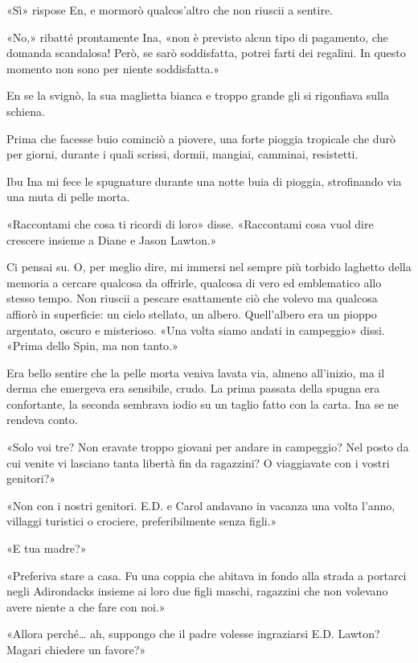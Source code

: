 «Sì» rispose En, e mormorò qualcos'altro che non riuscii a sentire.

«No,» ribatté prontamente Ina, «non è previsto alcun tipo di pagamento,
che domanda scandalosa! Però, se sarò soddisfatta, potrei farti dei
regalini. In questo momento non sono per niente soddisfatta.»

En se la svignò, la sua maglietta bianca e troppo grande gli si
rigonfiava sulla schiena.

Prima che facesse buio cominciò a piovere, una forte pioggia tropicale
che durò per giorni, durante i quali scrissi, dormii, mangiai, camminai,
resistetti.

\separatorefiori

Ibu Ina mi fece le spugnature durante una notte buia di pioggia,
strofinando via una muta di pelle morta.

«Raccontami che cosa ti ricordi di loro» disse. «Raccontami cosa vuol
dire crescere insieme a Diane e Jason Lawton.»

Ci pensai su. O, per meglio dire, mi immersi nel sempre più torbido
laghetto della memoria a cercare qualcosa da offrirle, qualcosa di vero
ed emblematico allo stesso tempo. Non riuscii a pescare esattamente ciò
che volevo ma qualcosa affiorò in superficie: un cielo stellato, un
albero. Quell'albero era un pioppo argentato, oscuro e misterioso. «Una
volta siamo andati in campeggio» dissi. «Prima dello Spin, ma non
tanto.»

Era bello sentire che la pelle morta veniva lavata via, almeno
all'inizio, ma il derma che emergeva era sensibile, crudo. La prima
passata della spugna era confortante, la seconda sembrava iodio su un
taglio fatto con la carta. Ina se ne rendeva conto.

«Solo voi tre? Non eravate troppo giovani per andare in campeggio? Nel
posto da cui venite vi lasciano tanta libertà fin da ragazzini? O
viaggiavate con i vostri genitori?»

«Non con i nostri genitori. E.D. e Carol andavano in vacanza una volta
l'anno, villaggi turistici o crociere, preferibilmente senza figli.»

«E tua madre?»

«Preferiva stare a casa. Fu una coppia che abitava in fondo alla strada
a portarci negli Adirondacks insieme ai loro due figli maschi, ragazzini
che non volevano avere niente a che fare con noi.»

«Allora perché\ldots{} ah, suppongo che il padre volesse ingraziarsi
E.D. Lawton? Magari chiedere un favore?»

